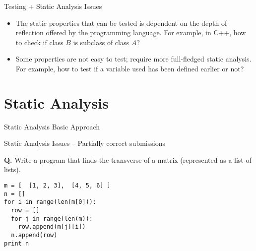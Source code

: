 \documentclass{beamer}
\begin{document}
\begin{frame}[fragile]{Testing + Static Analysis}
{Issues}

\begin{itemize}
\item The static properties that can be tested is dependent on the depth of reflection offered by the programming language. For example, in C++, how to check if class $B$ is subclass of class $A$?
\item Some properties are not easy to test; require more full-fledged static analysis. For example, how to test if a variable used has been defined earlier or not?
\end{itemize}
\end{frame}


\section{Static Analysis}

\begin{frame}[fragile]{Static Analysis}
{Basic Approach}

\begin{center}

\end{center}
\end{frame}


\begin{frame}[fragile]{Static Analysis}
{Issues -- Partially correct submissions}


\begin{framed}
\textbf{\color{Blue}Q.} Write a program that finds the transverse of a matrix (represented as a list of lists).
\end{framed}

\begin{lstlisting}[frame=single]
m = [  [1, 2, 3],  [4, 5, 6] ]
n = []
for i in range(len(m[0])):
  row = []
  for j in range(len(m)):
    row.append(m[j][i])
  n.append(row)
print n
\end{lstlisting}

\end{frame}
\end{document}
